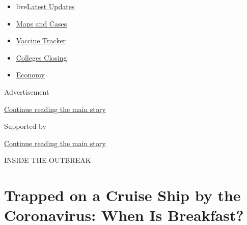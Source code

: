 \begin{itemize}
\tightlist
\item
  live\href{https://www.nytimes3xbfgragh.onion/2020/08/21/world/covid-19-coronavirus.html?name=styln-coronavirus-national\&region=TOP_BANNER\&variant=undefined\&block=storyline_menu_recirc\&action=click\&pgtype=Article\&impression_id=40e9a801-e3b2-11ea-a618-83a5d7d26e11}{Latest
  Updates}
\item
  \href{https://www.nytimes3xbfgragh.onion/interactive/2020/us/coronavirus-us-cases.html?name=styln-coronavirus-national\&region=TOP_BANNER\&variant=undefined\&block=storyline_menu_recirc\&action=click\&pgtype=Article\&impression_id=40e9a802-e3b2-11ea-a618-83a5d7d26e11}{Maps
  and Cases}
\item
  \href{https://www.nytimes3xbfgragh.onion/interactive/2020/science/coronavirus-vaccine-tracker.html?name=styln-coronavirus-national\&region=TOP_BANNER\&variant=undefined\&block=storyline_menu_recirc\&action=click\&pgtype=Article\&impression_id=40e9cf10-e3b2-11ea-a618-83a5d7d26e11}{Vaccine
  Tracker}
\item
  \href{https://www.nytimes3xbfgragh.onion/2020/08/19/us/colleges-closing-covid.html?name=styln-coronavirus-national\&region=TOP_BANNER\&variant=undefined\&block=storyline_menu_recirc\&action=click\&pgtype=Article\&impression_id=40e9cf11-e3b2-11ea-a618-83a5d7d26e11}{Colleges
  Closing}
\item
  \href{https://www.nytimes3xbfgragh.onion/live/2020/08/21/business/stock-market-today-coronavirus?name=styln-coronavirus-national\&region=TOP_BANNER\&variant=undefined\&block=storyline_menu_recirc\&action=click\&pgtype=Article\&impression_id=40e9cf12-e3b2-11ea-a618-83a5d7d26e11}{Economy}
\end{itemize}

Advertisement

\protect\hyperlink{after-top}{Continue reading the main story}

Supported by

\protect\hyperlink{after-sponsor}{Continue reading the main story}

INSIDE THE OUTBREAK

\hypertarget{trapped-on-a-cruise-ship-by-the-coronavirus-when-is-breakfast}{%
\section{Trapped on a Cruise Ship by the Coronavirus: When Is
Breakfast?}\label{trapped-on-a-cruise-ship-by-the-coronavirus-when-is-breakfast}}

